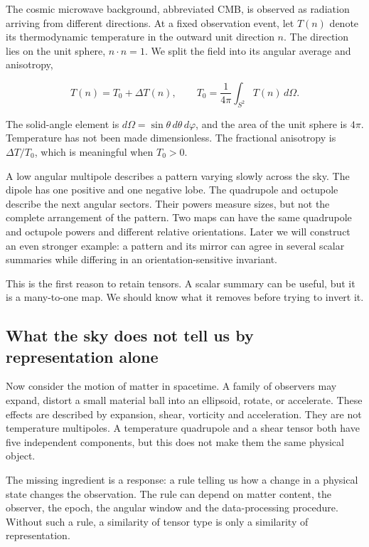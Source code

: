 \documentclass[
  11pt,
  a4paper]{article}
\begin{document}
The cosmic microwave background, abbreviated CMB, is observed as radiation arriving from different directions. At a fixed observation event, let \(T(n)\) denote its thermodynamic temperature in the outward unit direction \(n\). The direction lies on the unit sphere, \(n\cdot n=1\). We split the field into its angular average and anisotropy,

\[
T(n)=T_0+\Delta T(n),\qquad
T_0=\frac1{4\pi}\int_{S^2}T(n)\,d\Omega.
\tag{1.1}
\]

The solid-angle element is \(d\Omega=\sin\theta\,d\theta\,d\varphi\), and the area of the unit sphere is \(4\pi\). Temperature has not been made dimensionless. The fractional anisotropy is \(\Delta T/T_0\), which is meaningful when \(T_0>0\).

A low angular multipole describes a pattern varying slowly across the sky. The dipole has one positive and one negative lobe. The quadrupole and octupole describe the next angular sectors. Their powers measure sizes, but not the complete arrangement of the pattern. Two maps can have the same quadrupole and octupole powers and different relative orientations. Later we will construct an even stronger example: a pattern and its mirror can agree in several scalar summaries while differing in an orientation-sensitive invariant.

This is the first reason to retain tensors. A scalar summary can be useful, but it is a many-to-one map. We should know what it removes before trying to invert it.

\hypertarget{what-the-sky-does-not-tell-us-by-representation-alone}{%
\subsection{What the sky does not tell us by representation alone}\label{what-the-sky-does-not-tell-us-by-representation-alone}}

Now consider the motion of matter in spacetime. A family of observers may expand, distort a small material ball into an ellipsoid, rotate, or accelerate. These effects are described by expansion, shear, vorticity and acceleration. They are not temperature multipoles. A temperature quadrupole and a shear tensor both have five independent components, but this does not make them the same physical object.

The missing ingredient is a response: a rule telling us how a change in a physical state changes the observation. The rule can depend on matter content, the observer, the epoch, the angular window and the data-processing procedure. Without such a rule, a similarity of tensor type is only a similarity of representation.
\end{document}
